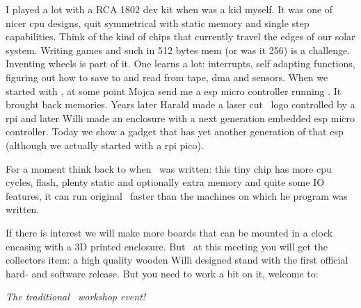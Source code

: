 \stoptitle

\starttitle[title=Dejavu]

\startitemize
\startitem
I played a lot with a RCA 1802 dev kit when was a kid myself. It was one of nicer
cpu designs, quit symmetrical with static memory and single step capabilities.
Think of the kind of chips that currently travel the edges of our solar system.
\stopitem
\startitem
Writing games and such in 512 bytes mem (or was it 256) is a challenge.
\stopitem
\startitem
Inventing wheels is part of it. One learns a lot: interrupts, self adapting
functions, figuring out how to save to and read from tape, dma and sensors.
\stopitem
\startitem
When we started with \LUATEX, at some point Mojca send me a esp micro controller
running \LUA. It brought back memories.
\stopitem
\startitem
Years later Harald made a laser cut \CONTEXT\ logo controlled by a rpi and later
Willi made an enclosure with a next generation embedded esp micro controller.
\stopitem
\startitem
Today we show a gadget that has yet another generation of that esp (although we
actually started with a rpi pico).
\stopitem

\blank[2*big]

\startitem
For a moment think back to when \TEX\ was written: this tiny chip has more cpu
cycles, flash, plenty static and optionally extra memory and quite some IO
features, it can run original \TEX\ faster than the machines on which
he program was written.
\stopitem
\stopitemize

\stoptitle

\starttitle[title=The workshop]

\startplacefigure[location={left,none}]
\stopplacefigure

\startitemize
\startitem
    If there is interest we will make more boards that can be mounted in a clock
    encasing with a 3D printed enclosure.
\stopitem
\startitem
    But \unknown\ at this meeting you will get the collectors item: a high
    quality wooden Willi designed stand with the first official hard- and
    software release.
\stopitem
\startitem
    But you need to work a bit on it, welcome to:

    {\em The traditional \CONTEXT\ workshop event!}
\stopitem
\stopitemize

\stoptitle

\stopdocument


